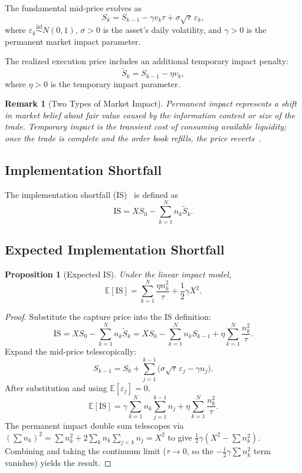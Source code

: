 \documentclass[11pt]{article}
\newtheorem{proposition}[theorem]{Proposition}
\newtheorem{remark}[theorem]{Remark}
\begin{document}
The fundamental mid-price evolves as
\[
S_k = S_{k-1} - \gamma v_k \tau + \sigma\sqrt{\tau}\,\varepsilon_k,
\]
where $\varepsilon_k \overset{\text{iid}}{\sim} N(0,1)$, $\sigma > 0$ is the asset's daily
volatility, and $\gamma > 0$ is the permanent market impact parameter.

The realized execution price includes an additional temporary impact penalty:
\[
\tilde{S}_k = S_{k-1} - \eta v_k,
\]
where $\eta > 0$ is the temporary impact parameter.

\begin{remark}[Two Types of Market Impact]
\emph{Permanent impact} represents a shift in market belief about fair value caused by the
information content or size of the trade. \emph{Temporary impact} is the transient cost of
consuming available liquidity; once the trade is complete and the order book refills, the price
reverts~\cite{kyle1985continuous}.
\end{remark}

\subsection{Implementation Shortfall}

The implementation shortfall (IS)~\cite{perold1988implementation} is defined as
\[
\text{IS} = X S_0 - \sum_{k=1}^{N} n_k \tilde{S}_k.
\]

\subsection{Expected Implementation Shortfall}

\begin{proposition}[Expected IS]
Under the linear impact model,
\[
\mathbb{E}[\text{IS}] = \sum_{k=1}^{N} \frac{\eta n_k^2}{\tau} + \frac{1}{2}\gamma X^2.
\]
\end{proposition}

\begin{proof}
Substitute the capture price into the IS definition:
\[
\text{IS} = XS_0 - \sum_{k=1}^N n_k\tilde{S}_k
= XS_0 - \sum_{k=1}^N n_k S_{k-1} + \eta\sum_{k=1}^N \frac{n_k^2}{\tau}.
\]
Expand the mid-price telescopically:
\[
S_{k-1} = S_0 + \sum_{j=1}^{k-1}\bigl(\sigma\sqrt{\tau}\,\varepsilon_j - \gamma n_j\bigr).
\]
After substitution and using $\mathbb{E}[\varepsilon_j] = 0$,
\[
\mathbb{E}[\text{IS}] = \gamma\sum_{k=1}^N n_k\sum_{j=1}^{k-1}n_j + \eta\sum_{k=1}^N\frac{n_k^2}{\tau}.
\]
The permanent impact double sum telescopes via $\left(\sum n_k\right)^2 = \sum n_k^2 + 2\sum_k n_k \sum_{j<k} n_j = X^2$ to give $\frac{1}{2}\gamma(X^2 - \sum n_k^2)$.
Combining and taking the continuum limit ($\tau \to 0$, so the $-\frac{1}{2}\gamma\sum n_k^2$ term vanishes) yields the result.
\end{proof}
\end{document}
